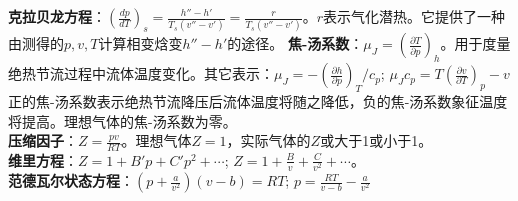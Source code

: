 \documentclass[a4paper,9pt]{ctexart}
\begin{document}
\textbf{克拉贝龙方程}：$\left(\frac{dp}{dT}\right)_s=\frac{h''-h'}{T_s(v''-v')}=\frac{r}{T_s(v''-v')}$。$r$表示气化潜热。它提供了一种由测得的$p,v,T$计算相变焓变$h''-h'$的途径。
\textbf{焦-汤系数}：$\mu_J=\left(\frac{\partial T}{\partial p}\right)_h$。用于度量绝热节流过程中流体温度变化。其它表示：$\mu_J=-\left(\frac{\partial h}{\partial p}\right)_T/c_p$; 
$\mu_Jc_p=T\left(\frac{\partial v}{\partial T}\right)_p-v$\\
正的焦-汤系数表示绝热节流降压后流体温度将随之降低，负的焦-汤系数象征温度将提高。理想气体的焦-汤系数为零。\\
\textbf{压缩因子}：$Z=\frac{pv}{RT}$。理想气体$Z=1$，实际气体的$Z$或大于1或小于1。\\
\textbf{维里方程}：$Z=1+B'p+C'p^2+\cdots$; $Z=1+\frac{B}{v}+\frac{C}{v^2}+\cdots$。\\
\textbf{范德瓦尔状态方程}：$\left(p+\frac{a}{v^2}\right)(v-b)=RT$; $p=\frac{RT}{v-b}-\frac{a}{v^2}$
\end{document}
